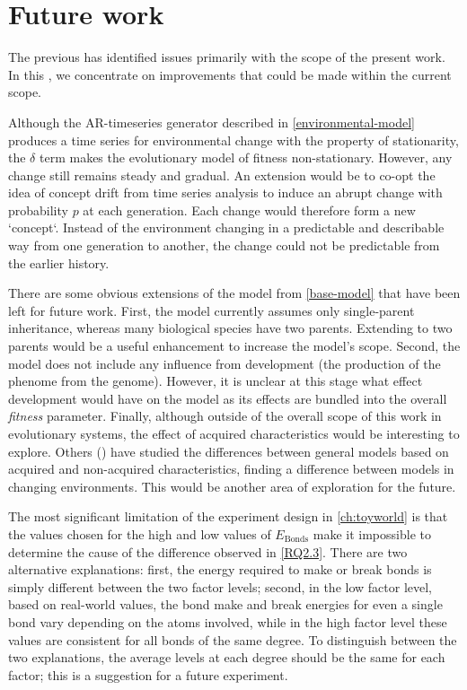 \section{Future work}\label{sec:future-work}

The previous  has identified issues primarily with the scope of the present work. In this , we concentrate on improvements that could be made within the current scope. 

Although the AR-timeseries generator described in \cref{environmental-model} produces a time series for environmental change with the property of stationarity, the $\delta$ term makes the evolutionary model of fitness non-stationary. However, any change still remains steady and gradual. An extension would be to co-opt the idea of concept drift from time series analysis to induce an abrupt change with probability $p$ at each generation. Each change would therefore form a new `concept`. Instead of the environment changing in a predictable and describable way from one generation to another, the change could not be predictable from the earlier history.

There are some obvious extensions of the model from \cref{base-model} that have been left for future work. First, the model currently assumes only single-parent inheritance, whereas many biological species have two parents. Extending to two parents would be a useful enhancement to increase the model's scope. Second, the model does not include any influence from development (the production of the phenome from the genome). However, it is unclear at this stage what effect development would have on the model as its effects are bundled into the overall \emph{fitness} parameter. Finally, although outside of the overall scope of this work in evolutionary systems, the effect of acquired characteristics would be interesting to explore. Others (\eg \textcite{Gaucherel2012,Paenke:2007ie,Sasaki:2000dq}) have studied the differences between general models based on acquired and non-acquired characteristics, finding a difference between models in changing environments. This would be another area of exploration for the future.

The most significant limitation of the experiment design in \cref{ch:toyworld} is that the values chosen for the high and low values of $E_\mathrm{Bonds}$ make it impossible to determine the cause of the difference observed in \cref{RQ2.3}. There are two alternative explanations: first, the energy required to make or break bonds is simply different between the two factor levels; second, in the low factor level, based on real-world values, the bond make and break energies for even a single bond vary depending on the atoms involved, while in the high factor level these values are consistent for all bonds of the same degree. To distinguish between the two explanations, the average levels at each degree should be the same for each factor; this is a suggestion for a future experiment.

